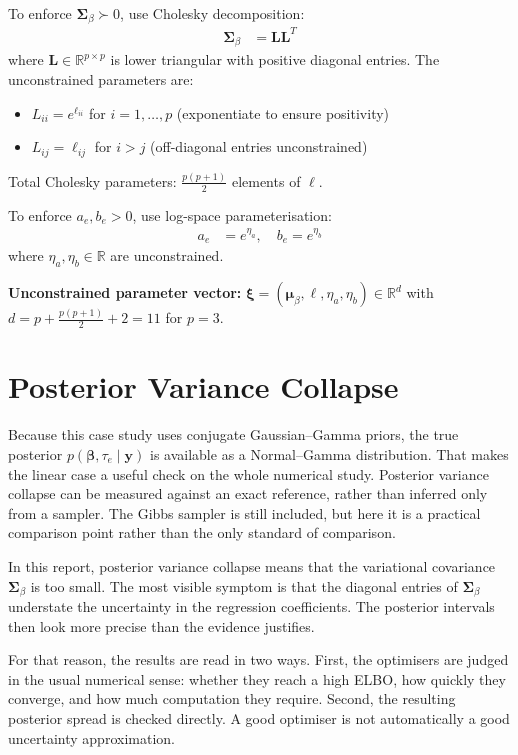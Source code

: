 \documentclass[11pt,a4paper]{article}
\newcommand{\R}{\mathbb{R}}
\begin{document}
To enforce $\bm{\Sigma}_\beta \succ 0$, use Cholesky decomposition:
\begin{align}
\bm{\Sigma}_\beta &= \bm{L}\bm{L}^T
\end{align}
where $\bm{L} \in \R^{p \times p}$ is lower triangular with positive diagonal entries. The unconstrained parameters are:
\begin{itemize}
\item $L_{ii} = e^{\ell_{ii}}$ for $i=1,\ldots,p$ (exponentiate to ensure positivity)
\item $L_{ij} = \ell_{ij}$ for $i > j$ (off-diagonal entries unconstrained)
\end{itemize}

Total Cholesky parameters: $\frac{p(p+1)}{2}$ elements of $\bm{\ell}$.

To enforce $a_e, b_e > 0$, use log-space parameterisation:
\begin{align}
a_e &= e^{\eta_a}, \quad b_e = e^{\eta_b}
\end{align}
where $\eta_a, \eta_b \in \R$ are unconstrained.

\textbf{Unconstrained parameter vector:} $\bm{\xi} = (\bm{\mu}_\beta, \bm{\ell}, \eta_a, \eta_b) \in \R^d$ with $d = p + \frac{p(p+1)}{2} + 2 = 11$ for $p=3$.

\section{Posterior Variance Collapse}
\label{sec:posterior-variance-collapse}

Because this case study uses conjugate Gaussian--Gamma priors, the true posterior $p(\bm{\beta}, \tau_e \mid \bm{y})$ is available as a Normal--Gamma distribution. That makes the linear case a useful check on the whole numerical study. Posterior variance collapse can be measured against an exact reference, rather than inferred only from a sampler. The Gibbs sampler is still included, but here it is a practical comparison point rather than the only standard of comparison.

In this report, posterior variance collapse means that the variational covariance $\bm{\Sigma}_\beta$ is too small. The most visible symptom is that the diagonal entries of $\bm{\Sigma}_\beta$ understate the uncertainty in the regression coefficients. The posterior intervals then look more precise than the evidence justifies.

For that reason, the results are read in two ways. First, the optimisers are judged in the usual numerical sense: whether they reach a high ELBO, how quickly they converge, and how much computation they require. Second, the resulting posterior spread is checked directly. A good optimiser is not automatically a good uncertainty approximation.
\end{document}
